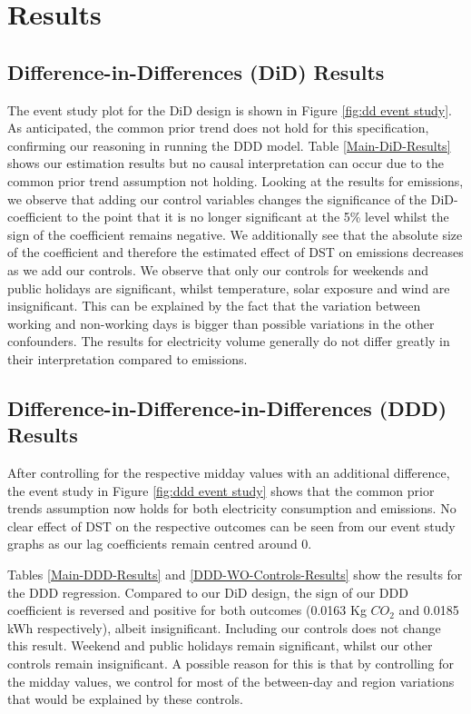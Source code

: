 
\section{Results}
\subsection{Difference-in-Differences (DiD) Results}

The event study plot for the \ac{DiD} design is shown in Figure \ref{fig:dd event study}. As anticipated, the common prior trend does not hold for this specification, confirming our reasoning in running the \ac{DDD} model.
Table \ref{Main-DiD-Results} shows our estimation results but no causal interpretation can occur due to the common prior trend assumption not holding. Looking at the results for emissions, we observe that adding our control variables changes the significance of the \ac{DiD}-coefficient to the point that it is no longer significant at the 5\% level whilst the sign of the coefficient remains negative. We additionally see that the absolute size of the coefficient and therefore the estimated effect of DST on emissions decreases as we add our controls. We observe that only our controls for weekends and public holidays are significant, whilst temperature, solar exposure and wind are insignificant. This can be explained by the fact that the variation between working and non-working days is bigger than possible variations in the other confounders. The results for electricity volume generally do not differ greatly in their interpretation compared to emissions.

\subsection{Difference-in-Difference-in-Differences (DDD) Results}

After controlling for the respective midday values with an additional difference, the event study in Figure \ref{fig:ddd event study} shows that the common prior trends assumption now holds for both electricity consumption and emissions. No clear effect of DST on the respective outcomes can be seen from our event study graphs as our lag coefficients remain centred around $0$.

Tables \ref{Main-DDD-Results} and \ref{DDD-WO-Controls-Results} show the results for the \ac{DDD} regression. 
Compared to our \ac{DiD} design, the sign of our \ac{DDD} coefficient is reversed and positive for both outcomes (0.0163 Kg $CO_2$ and 0.0185 kWh respectively), albeit insignificant. Including our controls does not change this result. Weekend and public holidays remain significant, whilst our other controls remain insignificant. A possible reason for this is that by controlling for the midday values, we control for most of the between-day and region variations that would be explained by these controls. 

